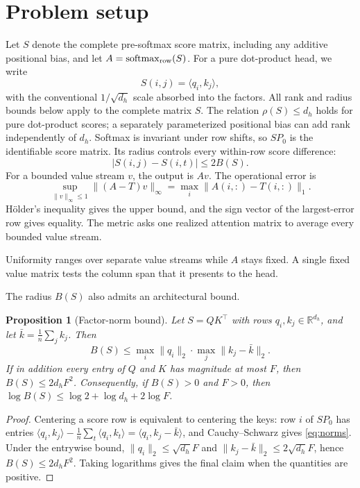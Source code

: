 \documentclass[10pt]{article} %
\newtheorem{proposition}[theorem]{Proposition}
\theoremstyle{definition}
\newcommand{\R}{\mathbb R}
\newcommand{\softmax}{\operatorname{softmax}}
\begin{document}
\section{Problem setup}

Let \(S\) denote the complete pre-softmax score matrix, including any
additive positional bias, and let \(A=\softmax_{\rm row}(S)\).  For a pure
dot-product head, we write
\[
 S(i,j)=\langle q_i,k_j\rangle,
\]
with the conventional \(1/\sqrt{d_h}\) scale absorbed into the factors.
All rank and radius bounds below apply to the complete matrix \(S\).
The relation \(\rho(S)\le d_h\) holds for pure dot-product scores; a
separately parameterized positional bias can add rank independently of
\(d_h\).
Softmax is invariant under row shifts, so
\(SP_0\) is the identifiable score matrix.  Its radius controls every
within-row score difference:
\[
 |S(i,j)-S(i,t)|\le 2B(S).
\]
For a bounded value stream \(v\), the output is \(Av\).  The operational
error is
\begin{equation}\label{eq:operator}
 \sup_{\|v\|_\infty\le1}\|(A-T)v\|_\infty
 =\max_i\|A(i,:)-T(i,:)\|_1 .
\end{equation}
H\"older's inequality gives the upper bound, and the sign vector of the
largest-error row gives equality.  The metric asks one realized attention
matrix to average every bounded value stream.

Uniformity ranges over separate value streams while \(A\) stays fixed.  A
single fixed value matrix tests the column span that it presents to the head.

The radius \(B(S)\) also admits an architectural bound.

\begin{proposition}[Factor-norm bound]\label{prop:norms}
Let \(S=QK^\top\) with rows \(q_i,k_j\in\R^{d_h}\), and let
\(\bar k=\frac1n\sum_jk_j\).  Then
\begin{equation}\label{eq:norms}
 B(S)\le\max_i\|q_i\|_2\cdot\max_j\|k_j-\bar k\|_2 .
\end{equation}
If in addition every entry of \(Q\) and \(K\) has magnitude at most \(F\),
then \(B(S)\le2d_hF^2\).  Consequently, if \(B(S)>0\) and \(F>0\),
then \(\log B(S)\le\log 2+\log d_h+2\log F\).
\end{proposition}

\begin{proof}
Centering a score row is equivalent to centering the keys: row \(i\) of
\(SP_0\) has entries
\(\langle q_i,k_j\rangle-\frac1n\sum_t\langle q_i,k_t\rangle
=\langle q_i,k_j-\bar k\rangle\), and Cauchy--Schwarz gives
\eqref{eq:norms}.  Under the entrywise bound,
\(\|q_i\|_2\le\sqrt{d_h}F\) and
\(\|k_j-\bar k\|_2\le2\sqrt{d_h}F\), hence
\(B(S)\le2d_hF^2\).  Taking logarithms gives the final claim when the
quantities are positive.
\end{proof}
\end{document}
